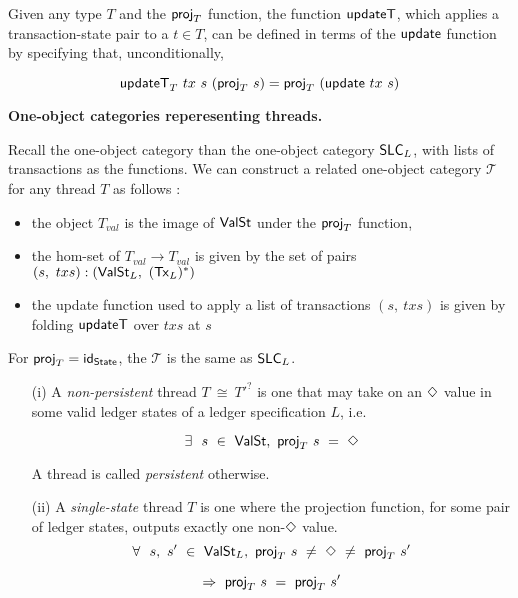 Given any type $T$ and the $\mathsf{proj}_T$ function, the function $\mathsf{updateT}$, which
applies a transaction-state pair to a $t \in T$,
can be defined in terms of the $\mathsf{update}$ function by specifying that, unconditionally,

\[ \mathsf{updateT}_T~tx~s~(\mathsf{proj}_T~s) = \mathsf{proj}_T~(\mathsf{update}~tx~s)\]

\textbf{One-object categories reperesenting threads. }

Recall the one-object category than the one-object category $\mathsf{SLC}_L$, with
lists of transactions as the functions. We can construct a related one-object category $\mathcal{T}$ for
any thread $T$ as follows :

\begin{itemize}
  \item the object $T_{val}$ is the image of $\mathsf{ValSt}$ under the $\mathsf{proj}_T$ function,
  \item the hom-set of $T_{val} \to T_{val}$ is given by the set of pairs
  $(s,~txs) : (\mathsf{ValSt}_{L},~(\mathsf{Tx}_{L})^{*})$

  \item the update function used to apply a list of transactions $(s,~txs)$ is given by
  folding $\mathsf{updateT}$ over $txs$ at $s$
\end{itemize}

For $\mathsf{proj}_T = \mathsf{id}_{\mathsf{State}}$, the $\mathcal{T}$ is the same as $\mathsf{SLC}_L$.


\begin{itemize}
  \item[(i)] A \emph{non-persistent} thread $T~\cong~T'^?$ is one that may take on an $\Diamond$ value in some valid ledger
  states of a ledger specification $L$, i.e.

  \[ \exists~~s~\in~\mathsf{ValSt},~\mathsf{proj}_T~s~=~\Diamond \]

  A thread is called \emph{persistent} otherwise.

  \item[(ii)] A \emph{single-state} thread $T$ is one where the projection function,
  for some pair of ledger states, outputs exactly one non-$\Diamond$ value.
  \[ \forall~~s,~s'~\in~\mathsf{ValSt}_L,~\mathsf{proj}_T~s~\neq~\Diamond~\neq~\mathsf{proj}_T~s' \]

  \[ \Rightarrow~\mathsf{proj}_T~s~=~\mathsf{proj}_T~s' \]

\end{itemize}


